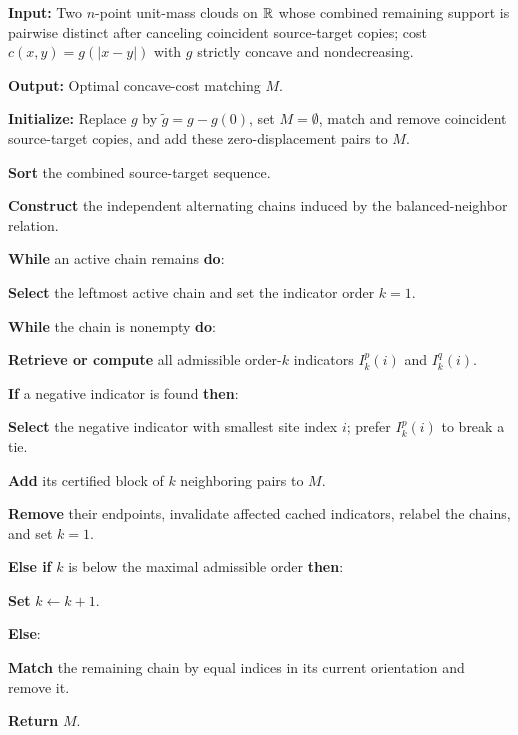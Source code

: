 \begin{alg}\label{alg:concave-line-local-indicators}
\textbf{Input:} Two $n$-point unit-mass clouds on $\mathbb{R}$ whose combined remaining support is pairwise distinct after canceling coincident source-target copies; cost $c(x,y)=g(|x-y|)$ with $g$ strictly concave and nondecreasing.

\textbf{Output:} Optimal concave-cost matching $M$.

\textbf{Initialize:} Replace $g$ by $\widetilde g=g-g(0)$, set $M=\emptyset$, match and remove coincident source-target copies, and add these zero-displacement pairs to $M$.

\textbf{Sort} the combined source-target sequence.

\textbf{Construct} the independent alternating chains induced by the balanced-neighbor relation.

\textbf{While} an active chain remains \textbf{do}:
\begin{algblock}

\textbf{Select} the leftmost active chain and set the indicator order $k=1$.

\textbf{While} the chain is nonempty \textbf{do}:
\begin{algblock}

\textbf{Retrieve or compute} all admissible order-$k$ indicators $I_k^p(i)$ and $I_k^q(i)$.

\textbf{If} a negative indicator is found \textbf{then}:
\begin{algblock}

\textbf{Select} the negative indicator with smallest site index $i$; prefer $I_k^p(i)$ to break a tie.

\textbf{Add} its certified block of $k$ neighboring pairs to $M$.

\textbf{Remove} their endpoints, invalidate affected cached indicators, relabel the chains, and set $k=1$.

\end{algblock}
\textbf{Else if} $k$ is below the maximal admissible order \textbf{then}:
\begin{algblock}
\textbf{Set} $k\leftarrow k+1$.
\end{algblock}
\textbf{Else}:
\begin{algblock}
\textbf{Match} the remaining chain by equal indices in its current orientation and remove it.
\end{algblock}

\end{algblock}

\end{algblock}
\algreturnskip
\textbf{Return} $M$.
\end{alg}

